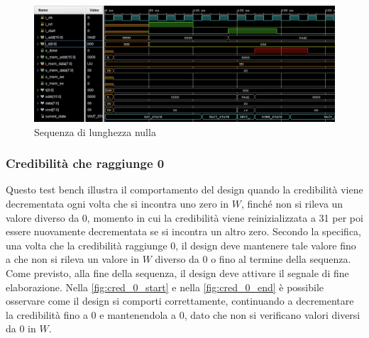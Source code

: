 \documentclass[11pt,a4paper]{article}
\begin{document}
\vspace{0.5em}
\begin{figure}[htbp]
    \centering
    \includegraphics[width=\textwidth]{resources/empty_sequence.png}
    \caption{Sequenza di lunghezza nulla}
    \label{fig:empty_sequence}
\end{figure}
\subsubsection{Credibilità che raggiunge 0}

Questo test bench illustra il comportamento del design quando la credibilità viene decrementata ogni volta che si incontra uno zero in $W$, finché non si rileva un valore diverso da 0, momento in cui la credibilità viene reinizializzata a 31 per poi essere nuovamente decrementata se si incontra un altro zero. Secondo la specifica, una volta che la credibilità raggiunge 0, il design deve mantenere tale valore fino a che non si rileva un valore in $W$ diverso da 0 o fino al termine della sequenza. Come previsto, alla fine della sequenza, il design deve attivare il segnale di fine elaborazione. Nella \autoref{fig:cred_0_start} e nella \autoref{fig:cred_0_end} è possibile osservare come il design si comporti correttamente, continuando a decrementare la credibilità fino a 0 e mantenendola a 0, dato che non si verificano valori diversi da 0 in $W$.
\end{document}
